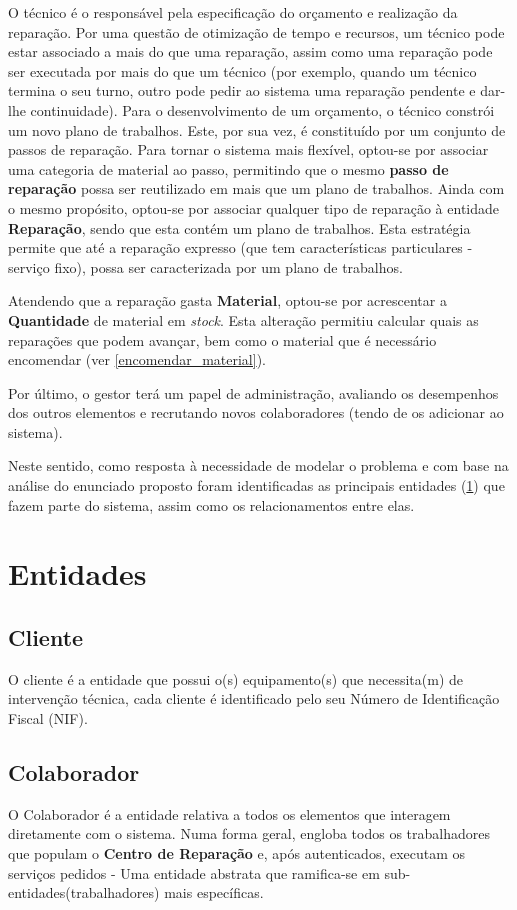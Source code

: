 \documentclass[a4paper,12pt]{scrreprt}
\begin{document}
O técnico é o responsável pela especificação do orçamento e realização da reparação.
Por uma questão de otimização de tempo e recursos, um técnico pode estar associado a mais do que uma reparação,
assim como uma reparação pode ser executada por mais do que um técnico 
(por exemplo, quando um técnico termina o seu turno, outro pode pedir ao sistema uma reparação pendente e dar-lhe continuidade).
Para o desenvolvimento de um orçamento, o técnico constrói um novo plano de trabalhos.
Este, por sua vez, é constituído por um conjunto de passos de reparação.
Para tornar o sistema mais flexível, optou-se por associar uma categoria de material ao passo,
permitindo que o mesmo \textbf{passo de reparação} possa ser reutilizado em mais que um plano de trabalhos.
Ainda com o mesmo propósito, optou-se por associar qualquer tipo de reparação à entidade \textbf{Reparação},
sendo que esta contém um plano de trabalhos.
Esta estratégia permite que até a reparação expresso (que tem características particulares - serviço fixo),
possa ser caracterizada por um plano de trabalhos.

Atendendo que a reparação gasta \textbf{Material}, optou-se por acrescentar a \textbf{Quantidade} de material em \textit{stock}.
Esta alteração permitiu calcular quais as reparações que podem avançar,
bem como o material que é necessário encomendar (ver \ref{encomendar_material}).

Por último, o gestor terá um papel de administração, avaliando os desempenhos dos outros elementos e
recrutando novos colaboradores (tendo de os adicionar ao sistema).

Neste sentido, como resposta à necessidade de modelar o problema e com base na análise do enunciado proposto foram identificadas as 
principais entidades (\ref{ent}) que fazem parte do sistema, assim como os relacionamentos entre elas. 

\section{Entidades}\label{ent}

\subsection{Cliente}\label{ent_cliente}
O cliente é a entidade que possui o(s) equipamento(s) que necessita(m) de intervenção técnica, cada cliente é identificado pelo 
seu Número de Identificação Fiscal (NIF).

\subsection{Colaborador} \label{ent_colaborador}
O Colaborador é a entidade relativa a todos os elementos que interagem diretamente com o sistema. 
Numa forma geral, engloba todos os trabalhadores que populam o \textbf{Centro de Reparação} e, após autenticados, executam os
serviços pedidos - Uma entidade abstrata que ramifica-se em sub-entidades(trabalhadores) mais específicas.
\end{document}

